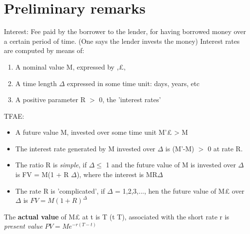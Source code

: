 \section{Preliminary remarks} 
\begin{dfn}
 Interest: Fee paid by the borrower to the lender, for having borrowed money over a certain period of time.
(One says the lender invests the money)
Interest rates are computed by means of:
\begin{enumerate}
 \item A nominal value M, expressed by \textlira,\pounds \;, \textdollar
\item A time length $\Delta$ expressed in some time unit: days, years, etc
\item A positive parameter R $\gt$ 0, the 'interest rates' 
\end{enumerate}

\end{dfn}
\begin{rem}
 TFAE: 

\begin{itemize}
 \item A future value M, invested over some time unit M'\pounds \; > M 
\item The interest rate generated by M invested over $\Delta$ is (M'-M) $\gt$ 0 at rate R.
\end{itemize}

\end{rem}
\begin{dfn}
\begin{itemize}
 \item The ratio R is \textit{simple}, if $\Delta \leq$ 1 and the future value of M is invested over $\Delta$ is 
FV = M(1 + R $\Delta$), where the interest is MR$\Delta$
\item The rate R is 'complicated', if $\Delta$ = 1,2,3,..., hen the future value of M\pounds \;
 over $\Delta$ is 
$FV = M(1 + R)^{\Delta}$ 
\end{itemize}

\end{dfn}
\begin{rem}
 The \textbf{actual value} of M\pounds \; at t is T (t \lt T), associated with the short rate r is \textit{present value}
$PV = Me^{-r(T-t)}$ 
\end{rem}
